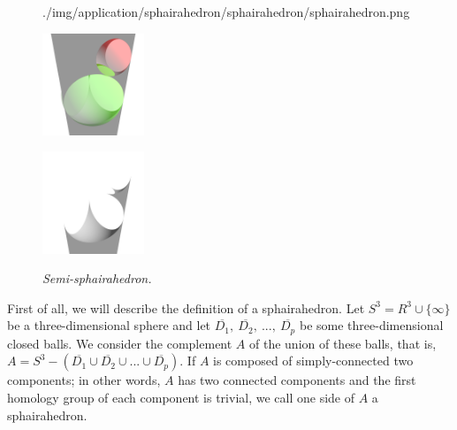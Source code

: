 \begin{figure}[h!tbp]
\begin{minipage}[t]{0.6\textwidth}
\begin{minipage}[t]{0.19\textwidth}
   {./img/application/sphairahedron/sphairahedron/sphairahedron.png}
   \label{fig:sphairahedronFinite}
  \end{minipage}
  \hspace*{\fill}
  \caption{\textit{Sphairahedron.}}
  \label{fig:sphairahedron}
 \end{minipage}
 \begin{minipage}[t]{0.4\textwidth}
  \centering
  \begin{minipage}[t]{0.19\textwidth}
   \includegraphics[width=1.2in, height=1.2in, keepaspectratio]{./img/application/sphairahedron/sphairahedron/semiSphairaAll.png}
   \label{fig:semi-sphairaAll}
  \end{minipage}
  \hspace*{\fill}
  \begin{minipage}[t]{0.19\textwidth}
   \includegraphics[width=1.2in, height=1.2in, keepaspectratio]{./img/application/sphairahedron/sphairahedron/semiSphairaHalf.png}
   \label{fig:semi-sphairaHalf}
  \end{minipage}
  \hspace*{\fill}
  \caption{\textit{Semi-sphairahedron.}}
  \label{fig:semi-sphairahedron}
 \end{minipage}
\end{figure}

\noindent
First of all, we will describe the definition of a sphairahedron.
Let $S^3 = R^3 \cup \{\infty\}$ be a three-dimensional sphere and let
$\overline{D_1},~\overline{D_2},~...,~\overline{D_p}$ be some three-dimensional closed balls.
We consider the complement $A$ of the union of these balls, that is,
$A = S^3 - (\overline{D_1} \cup \overline{D_2} \cup ... \cup \overline{D_p})$.
If $A$ is composed of simply-connected two components;
in other words, $A$ has two connected components and the first homology
group of each component is trivial, we call one side of $A$
a sphairahedron.


